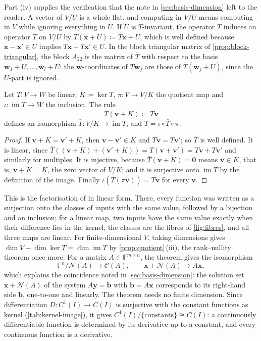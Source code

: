 Part (iv) supplies the verification that the note in \cref{sec:basis-dimension} left to the reader. A vector of $V/U$ is a whole flat, and computing in $V/U$ means computing in $V$ while ignoring everything in $U$. If $U$ is $T$-invariant, the operator $T$ induces an operator $\bar T$ on $V/U$ by $\bar T(\mathbf x+U)\coloneqq T\mathbf x+U$, which is well defined because $\mathbf x-\mathbf x'\in U$ implies $T\mathbf x-T\mathbf x'\in U$. In the block triangular matrix of \cref{prop:block-triangular}, the block $A_{22}$ is the matrix of $\bar T$ with respect to the basis $\mathbf w_1+U,\ldots,\mathbf w_l+U$: the $\mathbf w$-coordinates of $T\mathbf w_j$ are those of $\bar T(\mathbf w_j+U)$, since the $U$-part is ignored.

\begin{theorem}
\label{thm:first-isomorphism}
Let $T\colon V\to W$ be linear, $K\coloneqq\ker T$, $\pi\colon V\to V/K$ the quotient map and $\iota\colon\operatorname{im}T\to W$ the inclusion. The rule
\[
\bar T(\mathbf v+K)\coloneqq T\mathbf v
\]
defines an isomorphism $\bar T\colon V/K\to\operatorname{im}T$, and $T=\iota\circ\bar T\circ\pi$.
\end{theorem}

\begin{proof}
If $\mathbf v+K=\mathbf v'+K$, then $\mathbf v-\mathbf v'\in K$ and $T\mathbf v=T\mathbf v'$; so $\bar T$ is well defined. It is linear, since $\bar T((\mathbf v+K)+(\mathbf v'+K))=T(\mathbf v+\mathbf v')=T\mathbf v+T\mathbf v'$ and similarly for multiples. It is injective, because $\bar T(\mathbf v+K)=\mathbf 0$ means $\mathbf v\in K$, that is, $\mathbf v+K=K$, the zero vector of $V/K$; and it is surjective onto $\operatorname{im}T$ by the definition of the image. Finally $\iota(\bar T(\pi\mathbf v))=T\mathbf v$ for every $\mathbf v$.
\end{proof}

This is the factorisation of  in linear form. There, every function was written as a surjection onto the classes of inputs with the same value, followed by a bijection and an inclusion; for a linear map, two inputs have the same value exactly when their difference lies in the kernel, the classes are the fibres of \cref{fig:fibres}, and all three maps are linear. For finite-dimensional $V$, taking dimensions gives $\dim V-\dim\ker T=\dim\operatorname{im}T$ by \cref{prop:quotient}\,(iii), the rank--nullity theorem once more. For a matrix $A\in\mathbb F^{m\times n}$, the theorem gives the isomorphism
\[
\mathbb F^n/\mathcal N(A)\to\mathcal C(A),\qquad\mathbf x+\mathcal N(A)\mapsto A\mathbf x,
\]
which explains the coincidence noted in \cref{sec:basis-dimension}: the solution set $\mathbf x+\mathcal N(A)$ of the system $A\mathbf y=\mathbf b$ with $\mathbf b=A\mathbf x$ corresponds to its right-hand side $\mathbf b$, one-to-one and linearly. The theorem needs no finite dimension. Since differentiation $D\colon C^1(I)\to C(I)$ is surjective with the constant functions as kernel (\cref{tab:kernel-image}), it gives $C^1(I)/\{\text{constants}\}\cong C(I)$: a continuously differentiable function is determined by its derivative up to a constant, and every continuous function is a derivative.

